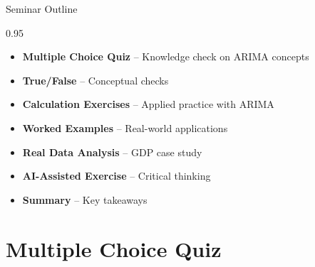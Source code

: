 \documentclass[9pt, aspectratio=169, t]{beamer}
\subtitle{Seminar 3: ARIMA Models}
\begin{document}
{
\begin{frame}
    \titlepage
\end{frame}
}


\begin{frame}{Seminar Outline}
    \begin{cminipage}{0.95\textwidth}
    \begin{itemize}
        \item \textbf{Multiple Choice Quiz} -- Knowledge check on ARIMA concepts
        \vspace{0.15cm}
        \item \textbf{True/False} -- Conceptual checks
        \vspace{0.15cm}
        \item \textbf{Calculation Exercises} -- Applied practice with ARIMA
        \vspace{0.15cm}
        \item \textbf{Worked Examples} -- Real-world applications
        \vspace{0.15cm}
        \item \textbf{Real Data Analysis} -- GDP case study
        \vspace{0.15cm}
        \item \textbf{AI-Assisted Exercise} -- Critical thinking
        \vspace{0.15cm}
        \item \textbf{Summary} -- Key takeaways
    \end{itemize}
    \end{cminipage}
\end{frame}

\section{Multiple Choice Quiz}
\end{document}
